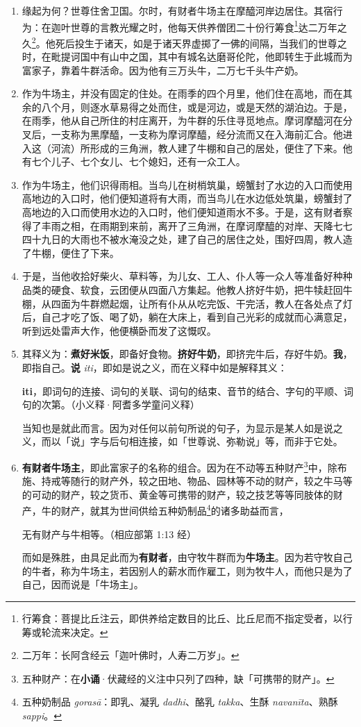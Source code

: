 \begin{enumerate}\item 缘起为何？世尊住舍卫国。尔时，有财者牛场主在摩醯河岸边居住。其宿行为：在迦叶世尊的言教光耀之时，他每天供养僧团二十份行筹食\footnote{行筹食：菩提比丘注云，即供养给定数目的比丘、比丘尼而不指定受者，以行筹或轮流来决定。}达二万年之久\footnote{二万年：长阿含经云「迦叶佛时，人寿二万岁」。}。他死后投生于诸天，如是于诸天界虚掷了一佛的间隔，当我们的世尊之时，在毗提诃国中有山中之国，其中有城名达磨哥伦陀，他即转生于此城而为富家子，靠着牛群活命。因为他有三万头牛，二万七千头牛产奶。
\item 作为牛场主，并没有固定的住处。在雨季的四个月里，他们住在高地，而在其余的八个月，则逐水草易得之处而住，或是河边，或是天然的湖泊边。于是，在雨季，他从自己所住的村庄离开，为牛群的乐住寻觅地点。摩诃摩醯河在分叉后，一支称为黑摩醯，一支称为摩诃摩醯，经分流而又在入海前汇合。他进入这（河流）所形成的三角洲，教人建了牛棚和自己的居处，便住了下来。他有七个儿子、七个女儿、七个媳妇，还有一众工人。
\item 作为牛场主，他们识得雨相。当鸟儿在树梢筑巢，螃蟹封了水边的入口而使用高地边的入口时，他们便知道将有大雨，而当鸟儿在水边低处筑巢，螃蟹封了高地边的入口而使用水边的入口时，他们便知道雨水不多。于是，这有财者察得了丰雨之相，在雨期到来前，离开了三角洲，在摩诃摩醯的对岸、天降七七四十九日的大雨也不被水淹没之处，建了自己的居住之处，围好四周，教人造了牛棚，便住了下来。
\item 于是，当他收拾好柴火、草料等，为儿女、工人、仆人等一众人等准备好种种品类的硬食、软食，云团便从四面八方集起。他教人挤好牛奶，把牛犊赶回牛棚，从四面为牛群燃起烟，让所有仆从从吃完饭、干完活，教人在各处点了灯后，自己才吃了饭、喝了奶，躺在大床上，看到自己光彩的成就而心满意足，听到远处雷声大作，他便横卧而发了这慨叹。
\item 其释义为：\textbf{煮好米饭}，即备好食物。\textbf{挤好牛奶}，即挤完牛后，存好牛奶。\textbf{我}，即指自己。\textbf{说} \textit{iti}，即如是说之义，而在义释中如是解释其义：\begin{quoting}\textbf{iti}，即词句的连接、词句的关联、词句的结束、音节的结合、字句的平顺、词句的次第。（小义释·阿耆多学童问义释）\end{quoting}当知也是就此而言。因为对任何以前句所说的句子，为显示是某人如是说之义，而以「说」字与后句相连接，如「世尊说、弥勒说」等，而非于它处。
\item \textbf{有财者牛场主}，即此富家子的名称的组合。因为在不动等五种财产\footnote{五种财产：在\textbf{小诵}·伏藏经的义注中只列了四种，缺「可携带的财产」。}中，除布施、持戒等随行的财产外，较之田地、物品、园林等不动的财产，较之牛马等的可动的财产，较之货币、黄金等可携带的财产，较之技艺等等同肢体的财产，牛的财产，就其为世间供给五种奶制品\footnote{五种奶制品 \textit{gorasā}：即乳、凝乳 \textit{dadhi}、酪乳 \textit{takka}、生酥 \textit{navanīta}、熟酥 \textit{sappi}。}的诸多助益而言，\begin{quoting}无有财产与牛相等。（相应部第 1:13 经）\end{quoting}而如是殊胜，由具足此而为\textbf{有财者}，由守牧牛群而为\textbf{牛场主}。因为若守牧自己的牛者，称为牛场主，若因别人的薪水而作雇工，则为牧牛人，而他只是为了自己，因而说是「牛场主」。

\end{enumerate}
